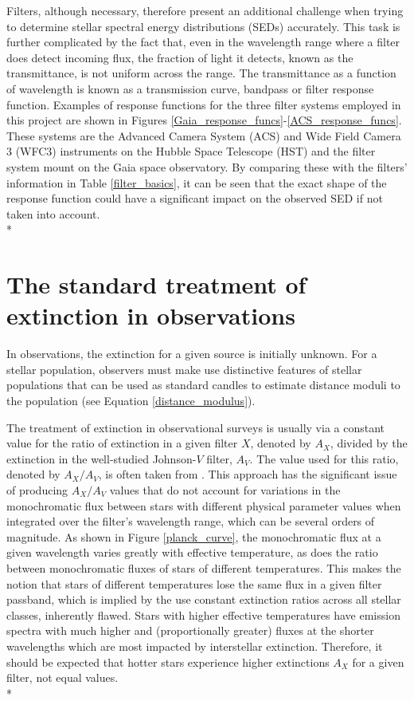 \documentclass[12pt, a4paper]{report}
\begin{document}
Filters, although necessary, therefore present an additional challenge when trying to determine stellar spectral energy distributions (SEDs) accurately. This task is further complicated by the fact that, even in the wavelength range where a filter does detect incoming flux, the fraction of light it detects, known as the transmittance, is not uniform across the range. The transmittance as a function of wavelength is known as a transmission curve, bandpass or filter response function. Examples of response functions for the three filter systems employed in this project are shown in Figures \ref{Gaia_response_funcs}-\ref{ACS_response_funcs}. These systems are the Advanced Camera System (ACS) and Wide Field Camera 3 (WFC3) instruments on the Hubble Space Telescope (HST) and the filter system mount on the Gaia space observatory. By comparing these with the filters' information in Table \ref{filter_basics}, it can be seen that the exact shape of the response function could have a significant impact on the observed SED if not taken into account.\\*

\section{The standard treatment of extinction in observations}
In observations, the extinction for a given source is initially unknown. For a stellar population, observers must make use distinctive features of stellar populations that can be used as standard candles to estimate distance moduli to the population (see Equation \ref{distance_modulus}).

The treatment of extinction in observational surveys is usually via a constant value for the ratio of extinction in a given filter $X$, denoted by $A_{X}$, divided by the extinction in the well-studied Johnson-$V$ filter, $A_{V}$. The value used for this ratio, denoted by $A_{X}/A_{V}$, is often taken from \cite{1985ApJ...288..618R}. This approach has the significant issue of producing $A_{X}/A_{V}$ values that do not account for  variations in the monochromatic flux between stars with different physical parameter values when integrated over the filter's wavelength range, which can be several orders of magnitude. As shown in Figure \ref{planck_curve}, the monochromatic flux at a given wavelength varies greatly with effective temperature, as does the ratio between monochromatic fluxes of stars of different temperatures. This makes the notion that stars of different temperatures lose the same flux in a given filter passband, which is implied by the use constant extinction ratios across all stellar classes, inherently flawed. Stars with higher effective temperatures have emission spectra with much higher and (proportionally greater) fluxes at the shorter wavelengths which are most impacted by interstellar extinction. Therefore, it should be expected that hotter stars experience higher extinctions $A_{X}$ for a given filter, not equal values.\\*
\end{document}
